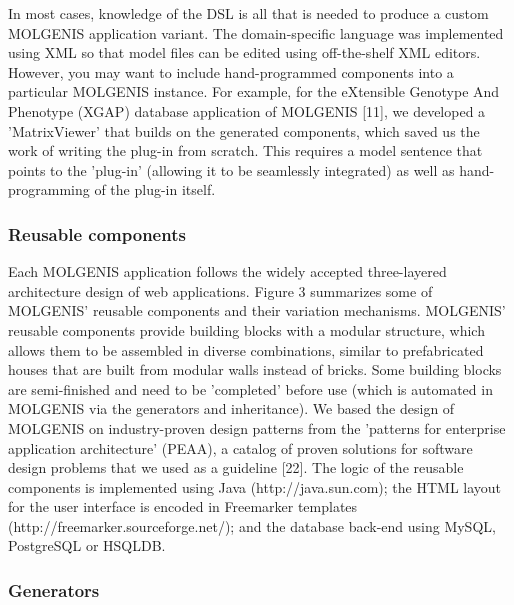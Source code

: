 \documentclass[8pt, twoside, a5paper]{report}
\begin{document}
In most cases, knowledge of the DSL is all that is needed to produce a custom MOLGENIS application variant. The domain-specific 
language was implemented using XML so that model files can be edited using off-the-shelf XML editors. However, you may want 
to include hand-programmed components into a particular MOLGENIS instance. For example, for the eXtensible Genotype And 
Phenotype (XGAP) database application of MOLGENIS [11], we developed a 'MatrixViewer' that builds on the generated components, 
which saved us the work of writing the plug-in from scratch. This requires a model sentence that points to the 'plug-in' 
(allowing it to be seamlessly integrated) as well as hand-programming of the plug-in itself.

\subsubsection{Reusable components}

Each MOLGENIS application follows the widely accepted three-layered architecture design of web applications. Figure 3 summarizes 
some of MOLGENIS' reusable components and their variation mechanisms. MOLGENIS' reusable components provide building blocks with 
a modular structure, which allows them to be assembled in diverse combinations, similar to prefabricated houses that are built 
from modular walls instead of bricks. Some building blocks are semi-finished and need to be 'completed' before use (which is 
automated in MOLGENIS via the generators and inheritance). We based the design of MOLGENIS on industry-proven design patterns 
from the 'patterns for enterprise application architecture' (PEAA), a catalog of proven solutions for software design problems 
that we used as a guideline [22]. The logic of the reusable components is implemented using Java (http://java.sun.com); the 
HTML layout for the user interface is encoded in Freemarker templates (http://freemarker.sourceforge.net/); and the database 
back-end using MySQL, PostgreSQL or HSQLDB.

\subsubsection{Generators}
\end{document}

